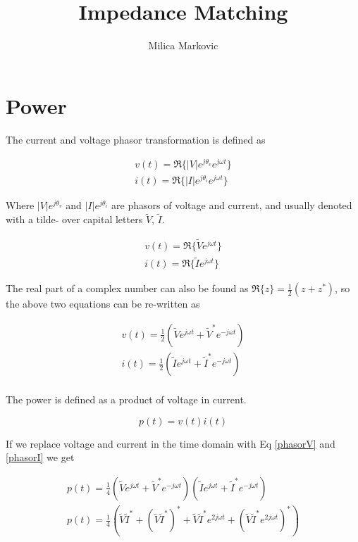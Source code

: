 \documentclass{ximera}
\title{Impedance Matching}
\author{Milica Markovic}
\begin{document}
  
\begin{abstract}  

\end{abstract}  
\maketitle    

\section{Power}

The current and voltage phasor transformation is defined as

\begin{eqnarray}
v(t)=\Re\{|V|e^{j\theta_v} e^{j \omega t}\} \\
i(t)=\Re\{|I|e^{j\theta_i} e^{j \omega t}\}
\end{eqnarray}

Where $|V|e^{j\theta_v}$ and $|I|e^{j\theta_i}$ are phasors of voltage and current, and usually denoted with a tilde $\tilde{}$ over capital letters  $\tilde{V}$, $\tilde{I}$.


\begin{eqnarray}
v(t)=\Re\{\tilde{V} e^{j \omega t}\} \\
i(t)=\Re\{\tilde{I} e^{j \omega t}\}
\end{eqnarray}


The real part of a complex number can also be found as $\Re\{z\}=\frac{1}{2}(z +z^*)$, so the above two equations can be re-written as

\begin{eqnarray}
v(t)=\frac{1}{2} ( \tilde{V}e^{j \omega t} + \tilde{V}^*e^{-j \omega t} ) \label{phasorV}\\
i(t)=\frac{1}{2} ( \tilde{I}e^{j \omega t} + \tilde{I}^*e^{-j \omega t} ) \label{phasorI}\\
\end{eqnarray}

The power is defined as a product of voltage in current.

\begin{equation}
p(t) = v(t) i(t)
\end{equation}

If we replace voltage and current in the time domain with Eq \ref{phasorV} and \ref{phasorI} we get



\begin{eqnarray}
p(t) =\frac{1}{4} ( \tilde{V}e^{j \omega t} + \tilde{V}^*e^{-j \omega t} ) ( \tilde{I}e^{j \omega t} + \tilde{I}^*e^{-j \omega t} ) \\
p(t)=\frac{1}{4} (\tilde{V}\tilde{I}^*+ (\tilde{V}\tilde{I}^*)^*+ \tilde{V}\tilde{I}^* e^{2j \omega t}+ (\tilde{V}\tilde{I}^* e^{2j \omega t})^*)
\end{eqnarray}
\end{document}
